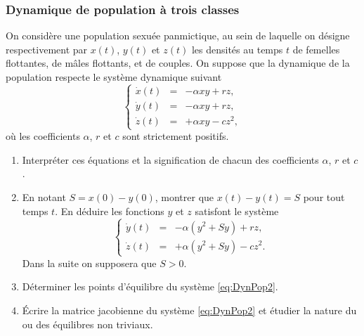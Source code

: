 \subsubsection{Dynamique de population à trois classes}

On considère une population sexuée panmictique, au sein de laquelle on désigne
respectivement par $x(t)$, $y(t)$ et $z(t)$ les densités au temps $t$ de femelles flottantes, de mâles flottants, et de couples. On suppose que la dynamique de la population respecte le système dynamique suivant
\begin{equation} \label{eq:DynPop}
  \left\{\begin{array}{rcl}
          \dot x(t) & = & - \alpha x y + r z, \\
          \dot y(t) & = & - \alpha x y + r z, \\
          \dot z(t) & = & + \alpha x y - c z^2,
          \end{array} \right.
\end{equation}
où les coefficients $\alpha$, $r$ et $c$ sont strictement positifs.
\begin{enumerate}
  \item Interpréter ces équations et la signification de chacun des coefficients $\alpha$, $r$ et $c$.
  \solution{\todo{}}
  \item En notant $S = x(0) - y(0)$, montrer que $x(t) - y(t) = S$ pour tout temps $t$. En
  déduire les fonctions $y$ et $z$ satisfont le système 
  \begin{equation} \label{eq:DynPop2}
    \left\{\begin{array}{rcl}
            \dot y(t) & = & - \alpha (y^2 + Sy) + r z, \\
            \dot z(t) & = & + \alpha (y^2 + Sy) - c z^2.
            \end{array} \right.
  \end{equation}
  Dans la suite on supposera que $S > 0$.
  \solution{\todo{}}
  \item Déterminer les points d'équilibre du système \eqref{eq:DynPop2}.
  \solution{\todo{}}
  \item \'Ecrire la matrice jacobienne du système \eqref{eq:DynPop2} et étudier la nature du ou des équilibres non triviaux.
  \solution{\todo{}}
\end{enumerate}

